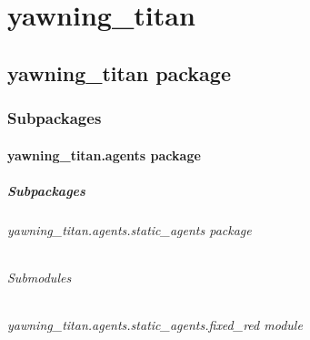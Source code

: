 \documentclass[letterpaper,10pt,english]{sphinxmanual}
\begin{document}
\chapter{yawning\_titan}
\label{\detokenize{source/modules:yawning-titan}}\label{\detokenize{source/modules::doc}}

\section{yawning\_titan package}
\label{\detokenize{source/yawning_titan:yawning-titan-package}}\label{\detokenize{source/yawning_titan::doc}}

\subsection{Subpackages}
\label{\detokenize{source/yawning_titan:subpackages}}

\subsubsection{yawning\_titan.agents package}
\label{\detokenize{source/yawning_titan.agents:yawning-titan-agents-package}}\label{\detokenize{source/yawning_titan.agents::doc}}

\paragraph{Subpackages}
\label{\detokenize{source/yawning_titan.agents:subpackages}}

\subparagraph{yawning\_titan.agents.static\_agents package}
\label{\detokenize{source/yawning_titan.agents.static_agents:yawning-titan-agents-static-agents-package}}\label{\detokenize{source/yawning_titan.agents.static_agents::doc}}

\subparagraph{Submodules}
\label{\detokenize{source/yawning_titan.agents.static_agents:submodules}}

\subparagraph{yawning\_titan.agents.static\_agents.fixed\_red module}
\label{\detokenize{source/yawning_titan.agents.static_agents:module-yawning_titan.agents.static_agents.fixed_red}}\label{\detokenize{source/yawning_titan.agents.static_agents:yawning-titan-agents-static-agents-fixed-red-module}}
\end{document}
